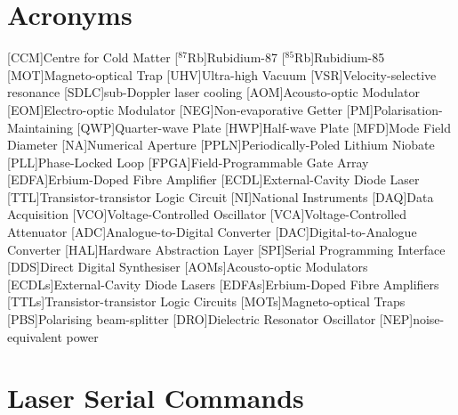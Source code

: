 \chapter*{Acronyms}
    \begin{acronym}
        [CCM]{Centre for Cold Matter}
        [\(^{87}\)Rb]{Rubidium-87}
        [\(^{85}\)Rb]{Rubidium-85}
        [MOT]{Magneto-optical Trap}
        [UHV]{Ultra-high Vacuum}
        [VSR]{Velocity-selective resonance}
        [SDLC]{sub-Doppler laser cooling}
        [AOM]{Acousto-optic Modulator}
        [EOM]{Electro-optic Modulator}
        [NEG]{Non-evaporative Getter}
        [PM]{Polarisation-Maintaining}
        [QWP]{Quarter-wave Plate}
        [HWP]{Half-wave Plate}
        [MFD]{Mode Field Diameter}
        [NA]{Numerical Aperture}
        [PPLN]{Periodically-Poled Lithium Niobate}
        [PLL]{Phase-Locked Loop}
        [FPGA]{Field-Programmable Gate Array}
        [EDFA]{Erbium-Doped Fibre Amplifier}
        [ECDL]{External-Cavity Diode Laser}
        [TTL]{Transistor-transistor Logic Circuit}
        [NI]{National Instruments}
        [DAQ]{Data Acquisition}
        [VCO]{Voltage-Controlled Oscillator}
        [VCA]{Voltage-Controlled Attenuator}
        [ADC]{Analogue-to-Digital Converter}
        [DAC]{Digital-to-Analogue Converter}
        [HAL]{Hardware Abstraction Layer}
        [SPI]{Serial Programming Interface}
        [DDS]{Direct Digital Synthesiser}
        [AOMs]{Acousto-optic Modulators}
        [ECDLs]{External-Cavity Diode Lasers}
        [EDFAs]{Erbium-Doped Fibre Amplifiers}
        [TTLs]{Transistor-transistor Logic Circuits}
        [MOTs]{Magneto-optical Traps}
        [PBS]{Polarising beam-splitter}
        [DRO]{Dielectric Resonator Oscillator}
        [NEP]{noise-equivalent power}
    \end{acronym}

\chapter{\Muquans Laser Serial
    Commands}\label{app:serial_commands}

